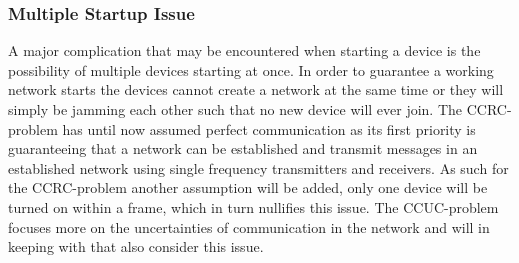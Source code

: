 \subsubsection*{Multiple Startup Issue}\label{msiCCRC}
A major complication that may be encountered when starting a device is the possibility of multiple devices starting at once.
In order to guarantee a working network starts the devices cannot create a network at the same time or they will simply be jamming each other such that no new device will ever join.
The CCRC-problem has until now assumed perfect communication as its first priority is guaranteeing that a network can be established and transmit messages in an established network using single frequency transmitters and receivers.
As such for the CCRC-problem another assumption will be added, only one device will be turned on within a frame, which in turn nullifies this issue.
The CCUC-problem focuses more on the uncertainties of communication in the network and will in keeping with that also consider this issue.